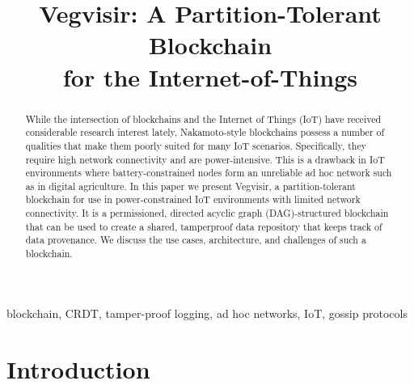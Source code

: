 \documentclass[conference, letterpaper]{IEEEtran}
\begin{document}
\title{Vegvisir: A Partition-Tolerant Blockchain \\ for the Internet-of-Things}

\author{
\and
{}
}

\maketitle

\begin{abstract}
While the intersection of blockchains and the Internet of Things (IoT) have received considerable research interest lately, Nakamoto-style blockchains possess a number of qualities that make them poorly suited for many IoT scenarios. Specifically, they require high network connectivity and are power-intensive. This is a drawback in IoT environments where battery-constrained nodes form an unreliable ad hoc network such as in digital agriculture. In this paper we present Vegvisir, a partition-tolerant blockchain for use in power-constrained IoT environments with limited network connectivity. It is a permissioned, directed acyclic graph (DAG)-structured blockchain that can be used to create a shared, tamperproof data repository that keeps track of data provenance. We discuss the use cases, architecture, and challenges of such a blockchain.
\end{abstract}

\begin{IEEEkeywords}
blockchain, CRDT, tamper-proof logging, ad hoc networks, IoT, gossip protocols
\end{IEEEkeywords}

\section{Introduction}
\end{document}
